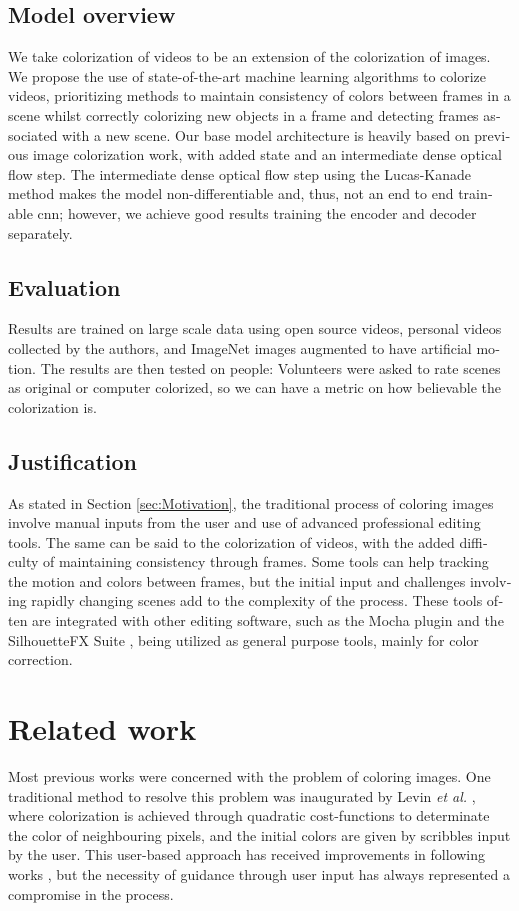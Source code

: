\documentclass[12pt,openright,oneside,a4paper,english, brazilian]{abntex2}
\begin{document}
\begin{otherlanguage}{english}
\section{Model overview}

We take colorization of videos to be an extension of the colorization of images. We propose the use of state-of-the-art machine learning algorithms to colorize videos, prioritizing methods to maintain consistency of colors between frames in a scene whilst correctly colorizing new objects in a frame and detecting frames associated with a new scene. Our base model architecture is heavily based on previous image colorization work, with added state and an intermediate dense optical flow step. The intermediate dense optical flow step using the Lucas-Kanade method makes the model non-differentiable and, thus, not an end to end trainable \acrshort{cnn}; however, we achieve good results training the encoder and decoder separately.

\section{Evaluation}
Results are trained on large scale data using open source videos, personal videos collected by the authors, and ImageNet images augmented to have artificial motion. The results are then tested on people: Volunteers were asked to rate scenes as original or computer colorized, so we can have a metric on how believable the colorization is.

\section{Justification}
As stated in Section \ref{sec:Motivation}, the traditional process of coloring images involve manual inputs from the user and use of advanced professional editing tools. The same can be said to the colorization of videos, with the added difficulty of maintaining consistency through frames. Some tools can help tracking the motion and colors between frames, but the initial input and challenges involving rapidly changing scenes add to the complexity of the process. These tools often are integrated with other editing software, such as the Mocha plugin \cite{mocha} and the SilhouetteFX Suite \cite{silhoutte}, being utilized as general purpose tools, mainly for color correction.

\chapter{Related work}
Most previous works were concerned with the problem of coloring images. One traditional method to resolve this problem was inaugurated by Levin  \textit{et al.} \cite{Levin2004},
where colorization is achieved through quadratic cost-functions to determinate the color of neighbouring pixels, and the initial colors are given by scribbles input by the user. This user-based approach has received improvements in following works \cite{Huang2005} \cite{Kumar2012},
but the necessity of guidance through user input has always represented a compromise in the process.


\end{otherlanguage}
\end{document}
